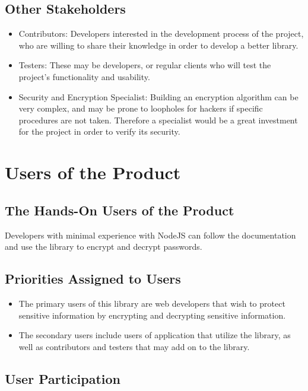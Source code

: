 \documentclass[12pt]{article}
\begin{document}
\subsection{Other Stakeholders}
	\begin{itemize}

	  \item Contributors: Developers interested in the development process of the project, who are willing to share their knowledge in order to develop a better library.
	  \item Testers: These may be developers, or regular clients who will test the project’s functionality and usability.

	  \item Security and Encryption Specialist: Building an encryption algorithm can be very complex, and may be prone to loopholes for hackers if specific procedures are not taken. Therefore a specialist would be a great investment for the project in order to verify its security. 
	\end{itemize}

\section{Users of the Product}

\subsection{ The Hands-On Users of the Product}
Developers with minimal experience with NodeJS can follow the documentation and use the library to encrypt and decrypt passwords.

\subsection{Priorities Assigned to Users}

	\begin{itemize}
		\item The primary users of this library are web developers that wish to protect sensitive information by encrypting and decrypting sensitive information.

		\item The secondary users include users of application that utilize the library, as well as contributors and testers that may add on to the library.
	\end{itemize}

\subsection{User Participation}
\end{document}
